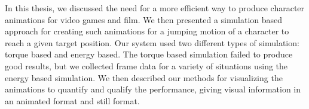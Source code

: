In this thesis, we discussed the need for a more efficient way to produce character animations for video games and film.  We then presented a simulation based approach for creating such animations for a jumping motion of a character to reach a given target position.  Our system used two different types of simulation: torque based and energy based.  The torque based simulation failed to produce good results, but we collected frame data for a variety of situations using the energy based simulation.  We then described our methods for visualizing the animations to quantify and qualify the performance, giving visual information in an animated format and still format.

